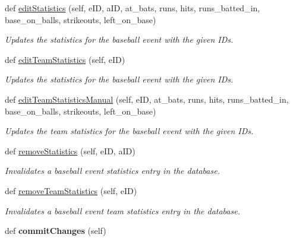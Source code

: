 \begin{DoxyCompactItemize}
def \hyperlink{classhandler_1_1dao_1_1baseball__event__dao_1_1_baseball_event_d_a_o_a679084f6b576917c7ad24055e0200873}{edit\+Statistics} (self, e\+ID, a\+ID, at\+\_\+bats, runs, hits, runs\+\_\+batted\+\_\+in, base\+\_\+on\+\_\+balls, strikeouts, left\+\_\+on\+\_\+base)
\begin{DoxyCompactList}\small\item\em Updates the statistics for the baseball event with the given I\+Ds. \end{DoxyCompactList}\item 
def \hyperlink{classhandler_1_1dao_1_1baseball__event__dao_1_1_baseball_event_d_a_o_a9cb569c979ad479dfb6fb53516c9fd6c}{edit\+Team\+Statistics} (self, e\+ID)
\begin{DoxyCompactList}\small\item\em Updates the statistics for the baseball event with the given I\+Ds. \end{DoxyCompactList}\item 
def \hyperlink{classhandler_1_1dao_1_1baseball__event__dao_1_1_baseball_event_d_a_o_a18eec407eddeab50984d53785bcbc6c1}{edit\+Team\+Statistics\+Manual} (self, e\+ID, at\+\_\+bats, runs, hits, runs\+\_\+batted\+\_\+in, base\+\_\+on\+\_\+balls, strikeouts, left\+\_\+on\+\_\+base)
\begin{DoxyCompactList}\small\item\em Updates the team statistics for the baseball event with the given I\+Ds. \end{DoxyCompactList}\item 
def \hyperlink{classhandler_1_1dao_1_1baseball__event__dao_1_1_baseball_event_d_a_o_ac60fa40a9fe92a1d3d41dbbaeae116dc}{remove\+Statistics} (self, e\+ID, a\+ID)
\begin{DoxyCompactList}\small\item\em Invalidates a baseball event statistics entry in the database. \end{DoxyCompactList}\item 
def \hyperlink{classhandler_1_1dao_1_1baseball__event__dao_1_1_baseball_event_d_a_o_a478d1bc34edaec4f1d95218eb8484cee}{remove\+Team\+Statistics} (self, e\+ID)
\begin{DoxyCompactList}\small\item\em Invalidates a baseball event team statistics entry in the database. \end{DoxyCompactList}\item 
\mbox{\label{classhandler_1_1dao_1_1baseball__event__dao_1_1_baseball_event_d_a_o_a4aa7b9693a8305cd7b10c69b393a9992}} 
def {\bfseries commit\+Changes} (self)
\end{DoxyCompactItemize}

